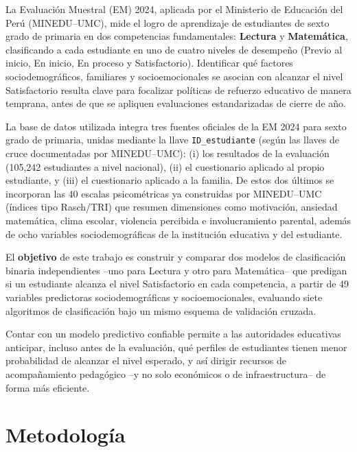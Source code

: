 \documentclass[11pt]{article}
\begin{document}
La Evaluación Muestral (EM) 2024, aplicada por el Ministerio de
Educación del Perú (MINEDU--UMC), mide el logro de aprendizaje de
estudiantes de sexto grado de primaria en dos competencias
fundamentales: \textbf{Lectura} y \textbf{Matemática}, clasificando a
cada estudiante en uno de cuatro niveles de desempeño (Previo al inicio,
En inicio, En proceso y Satisfactorio). Identificar qué factores
sociodemográficos, familiares y socioemocionales se asocian con alcanzar
el nivel Satisfactorio resulta clave para focalizar políticas de
refuerzo educativo de manera temprana, antes de que se apliquen
evaluaciones estandarizadas de cierre de año.

La base de datos utilizada integra tres fuentes oficiales de la EM 2024
para sexto grado de primaria, unidas mediante la llave \texttt{ID\_estudiante}
(según las llaves de cruce documentadas por MINEDU--UMC): (i) los
resultados de la evaluación (105{,}242 estudiantes a nivel nacional),
(ii) el cuestionario aplicado al propio estudiante, y (iii) el
cuestionario aplicado a la familia. De estos dos últimos se incorporan
las 40 escalas psicométricas ya construidas por MINEDU--UMC (índices
tipo Rasch/TRI) que resumen dimensiones como motivación, ansiedad
matemática, clima escolar, violencia percibida e involucramiento
parental, además de ocho variables sociodemográficas de la institución
educativa y del estudiante.

El \textbf{objetivo} de este trabajo es construir y comparar dos modelos
de clasificación binaria independientes --uno para Lectura y otro para
Matemática-- que predigan si un estudiante alcanza el nivel
Satisfactorio en cada competencia, a partir de 49 variables predictoras
sociodemográficas y socioemocionales, evaluando siete algoritmos de
clasificación bajo un mismo esquema de validación cruzada.

Contar con un modelo predictivo confiable permite a las autoridades
educativas anticipar, incluso antes de la evaluación, qué perfiles de
estudiantes tienen menor probabilidad de alcanzar el nivel esperado, y
así dirigir recursos de acompañamiento pedagógico --y no solo
económicos o de infraestructura-- de forma más eficiente.

\section{Metodología}
\end{document}
